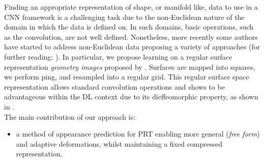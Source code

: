 Finding an appropriate representation of shape, or manifold like, data to use in a CNN framework is a challenging task due to the non-Euclidean nature of the domain in which the data is defined on. In such domains, basic operations, such as the convolution, are not well defined. Nonetheless, more recently some authors have started to address non-Euclidean data proposing a variety of approaches \cite{ShapeNet1, Geometric_deep_learning, CNN_on_Torus} (for further reading: \cite{GeoDeepLearning}).
In particular, we propose learning on a regular surface representation \textit{geometry images} proposed by \citep{gu2002geometry}. Surfaces are mapped into squares, we perform ping, and resampled into a regular grid. This regular surface space representation allows standard convolution operations and shows to be advantageous within the DL context due to its dieffeomorphic property, as shown in \cite{sinha2016deep}. 
\\
The main contribution of our approach is: 
\begin{itemize}
\item a method of appearance prediction for PRT enabling more general (\textit{free form}) and adaptive deformations, whilst maintaining a fixed compressed representation.
\end{itemize}

